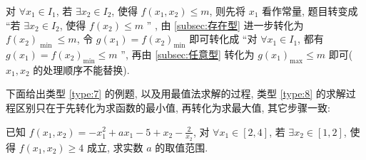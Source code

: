 \begin{type}\label{type:8}
  对 \(\forall {x}_{1} \in  {I}_{1}\), 若 \(\exists {x}_{2} \in  {I}_{2}\), 使得 \(f(x_1, x_2)  \leq  m\), 则先将 \({x}_{1}\) 看作常量, 题目转变成 “若 \(\exists {x}_{2} \in  {I}_{2}\), 使得 \(f\left( {x}_{2}\right)  \leq  m\) ” , 由 \ref{subsec:存在型} 进一步转化为 \(f{\left( {x}_{2}\right) }_{\text{ min }} \leq  m\), 令 \(g\left( {x}_{1}\right)  = f{\left( {x}_{2}\right) }_{\min }\) 即可转化成 “对 \(\forall {x}_{1} \in  {I}_{1}\), 都有 \(g\left( {x}_{1}\right)  = f{\left( {x}_{2}\right) }_{\min } \leq  m\) ”, 再由 \ref{subsec:任意型} 转化为 \(g{\left( {x}_{1}\right) }_{\max } \leq  m\) 即可( \({x}_{1}, {x}_{2}\) 的处理顺序不能替换).
\end{type}

下面给出类型 \ref{type:7} 的例题, 以及用最值法求解的过程, 类型 \ref{type:8} 的求解过程区别只在于先转化为求函数的最小值, 再转化为求最大值, 其它步骤一致:

\begin{variation}\label{variation:2.1.5}
  已知 \(f(x_1, x_2)  =  -{x}_{1}^{2} + a{x}_{1} -5 + {x}_{2} -\frac{2}{{x}_{2}}\), 对 \(\forall {x}_{1} \in  \left\lbrack  {2, 4}\right\rbrack\), 若 \(\exists {x}_{2} \in  \left\lbrack  {1, 2}\right\rbrack\), 使得 \(f(x_1, x_2)  \geq  4\) 成立, 求实数 \(a\) 的取值范围.
\end{variation}

